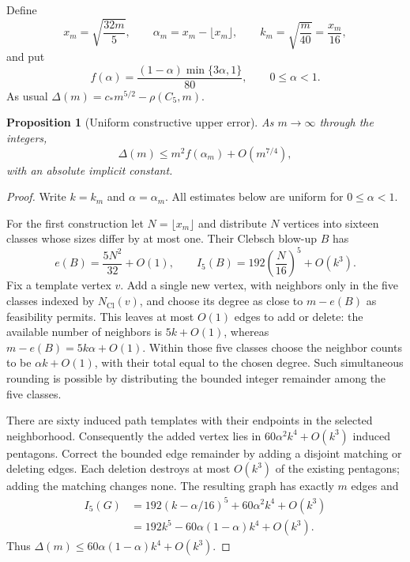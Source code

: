 \documentclass[11pt]{amsart}
\newtheorem{proposition}[theorem]{Proposition}
\theoremstyle{definition}
\theoremstyle{remark}
\begin{document}
Define
\[
 x_m=\sqrt{\frac{32m}{5}},\qquad
 \alpha_m=x_m-\lfloor x_m\rfloor,\qquad
 k_m=\sqrt{\frac{m}{40}}=\frac{x_m}{16},
\]
and put
\[
 f(\alpha)=\frac{(1-\alpha)\min\{3\alpha,1\}}{80},
 \qquad 0\leq\alpha<1.
\]
As usual $\Delta(m)=c_\ast m^{5/2}-\rho(C_5,m)$.

\begin{proposition}[Uniform constructive upper error]
\label{prop:constructive-error}
As $m\to\infty$ through the integers,
\[
 \Delta(m)\leq m^2 f(\alpha_m)+O(m^{7/4}),
\]
with an absolute implicit constant.
\end{proposition}
\begin{proof}
Write $k=k_m$ and $\alpha=\alpha_m$. All estimates below are uniform for
$0\leq\alpha<1$.

For the first construction let $N=\lfloor x_m\rfloor$ and distribute $N$
vertices into sixteen classes whose sizes differ by at most one. Their
Clebsch blow-up $B$ has
\[
 e(B)=\frac{5N^2}{32}+O(1),\qquad
 I_5(B)=192\left(\frac{N}{16}\right)^5+O(k^3).
\]
Fix a template vertex $v$. Add a single new vertex, with neighbors only
in the five classes indexed by $N_{\mathrm{Cl}}(v)$, and choose its degree
as close to $m-e(B)$ as feasibility permits. This leaves at most $O(1)$
edges to add or delete: the available number of neighbors is $5k+O(1)$,
whereas $m-e(B)=5k\alpha+O(1)$. Within those five classes choose the
neighbor counts to be $\alpha k+O(1)$, with their total equal to the
chosen degree. Such simultaneous rounding is possible by distributing
the bounded integer remainder among the five classes.

There are sixty induced path templates with their endpoints in the
selected neighborhood. Consequently the added vertex lies in
$60\alpha^2k^4+O(k^3)$ induced pentagons. Correct the bounded edge
remainder by adding a disjoint matching or deleting edges. Each deletion
destroys at most $O(k^3)$ of the existing pentagons; adding the matching
changes none. The resulting graph has exactly $m$ edges and
\begin{align*}
 I_5(G)&=192(k-\alpha/16)^5+60\alpha^2k^4+O(k^3)\\
       &=192k^5-60\alpha(1-\alpha)k^4+O(k^3).
\end{align*}
Thus $\Delta(m)\leq60\alpha(1-\alpha)k^4+O(k^3)$.


\end{proof}
\end{document}

